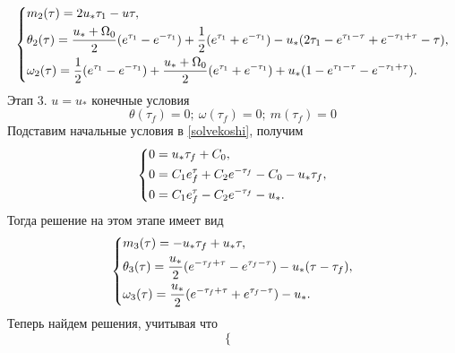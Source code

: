 \documentclass[a4paper,14pt]{article}
\theoremstyle{plain} %
\theoremstyle{definition} %
\theoremstyle{remark} %
\begin{document}
{\begin{equation}\label{final2stage}
    \left\{ {\begin{aligned}
                 & m_2(\tau) = 2u_*\tau_1-u\tau, \hfill                                                                                                                            \\
                 & \theta_2(\tau) = \frac{u_*+\Omega_0}{2}(e^{\tau_1}-e^{-\tau_1})+\frac{1}{2}(e^{\tau_1}+e^{-\tau_1})-u_*(2\tau_1-e^{\tau_1-\tau}+e^{-\tau_1+\tau}-\tau) , \hfill \\
                 & \omega_2(\tau) = \frac{1}{2}(e^{\tau_1}-e^{-\tau_1})+\frac{u_*+\Omega_0}{2}(e^{\tau_1}+e^{-\tau_1})+u_*(1-e^{\tau_1-\tau}-e^{-\tau_1+\tau})  . \hfill           \\
            \end{aligned}} \right.
\end{equation}
Этап 3. $u=u_*$ конечные условия
\[
    \theta(\tau_f)=0;\ \omega(\tau_f)=0;\ m(\tau_f)=0
\]
Подставим начальные условия в \eqref{solvekoshi}, получим
\begin{equation}\label{stage31}
    \left\{ {\begin{aligned}
                 & 0 = u_*\tau_f+C_0, \hfill                             \\
                 & 0 = C_1e^\tau_f+C_2e^{-\tau_f}-C_0-u_*\tau_f , \hfill \\
                 & 0 = C_1e^\tau_f-C_2e^{-\tau_f}-u_*  . \hfill          \\
            \end{aligned}} \right.
\end{equation}
Тогда решение на этом этапе имеет вид
\begin{equation}\label{final3stage}
    \left\{ {\begin{aligned}
                 & m_3(\tau) = -u_*\tau_f+u_*\tau, \hfill                                                    \\
                 & \theta_3(\tau) = \frac{u_*}{2}(e^{-\tau_f+\tau}-e^{\tau_f-\tau})-u_*(\tau-\tau_f), \hfill \\
                 & \omega_3(\tau) = \frac{u_*}{2}(e^{-\tau_f+\tau}+e^{\tau_f-\tau})-u_*  . \hfill            \\
            \end{aligned}} \right.
\end{equation}
Теперь найдем решения, учитывая что
\begin{equation}\label{T2equalT3}
    \left\{ {\begin{aligned}

\end{aligned}}
\end{equation}}
\end{document}
